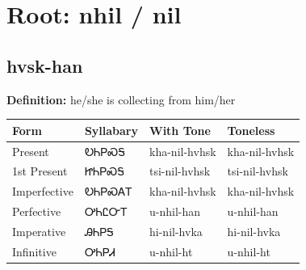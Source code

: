 \documentclass{article}%
\begin{document}
%
\normalsize%
\section*{Root: nhil / nil}%
\subsection*{hvsk-han}%
\textbf{Definition: }%
he/she is collecting from him/her%
\\[0.5em]%
\begin{tabular}{|l|l|l|l|}%
\hline%
\textbf{Form}&\textbf{Syllabary}&\textbf{With Tone}&\textbf{Toneless}\\%
\hline%
Present&ᎧᏂᏢᏍᎦ&kha{-}nil{-}hvhsk&kha{-}nil{-}hvhsk\\%
1st Present&ᏥᏂᏢᏍᎦ&tsi{-}nil{-}hvhsk&tsi{-}nil{-}hvhsk\\%
Imperfective&ᎧᏂᏢᏍᎪᎢ&kha{-}nil{-}hvhsk&kha{-}nil{-}hvhsk\\%
Perfective&ᎤᏂᏝᏅᎢ&u{-}nhil{-}han&u{-}nhil{-}han\\%
Imperative&ᎯᏂᏢᎦ&hi{-}nil{-}hvka&hi{-}nil{-}hvka\\%
Infinitive&ᎤᏂᏢᏗ&u{-}nhil{-}ht&u{-}nhil{-}ht\\%
\hline%
\end{tabular}%
\\[1em]%
\end{document}
